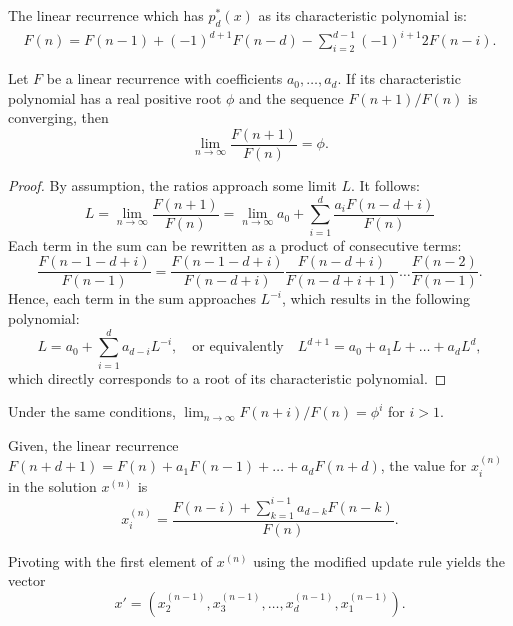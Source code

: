 \documentclass[english,version-2020-11]{uzl-thesis}
\begin{document}
\begin{example}
  The linear recurrence which has $p_d^*(x)$ as its characteristic polynomial is:
  \begin{align*}
    F(n) = F(n - 1) + (-1)^{d+1} F(n - d) - \sum_{i=2}^{d - 1} (-1)^{i+1} 2 F(n - i).
  \end{align*}
\end{example}

\begin{lemma}
  Let $F$ be a linear recurrence with coefficients $a_0, \dots, a_d$.
  If its characteristic polynomial has a real positive root $\phi$
  and the sequence $F(n+1)/F(n)$ is converging, then
  \[
    \lim_{n \to \infty} \frac{F(n + 1)}{F(n)} = \phi.
  \]
\end{lemma}

\begin{proof}
  By assumption, the ratios approach some limit $L$. It follows:
  \[
    L
    = \lim_{n \to \infty} \frac{F(n + 1)}{F(n)}
    = \lim_{n \to \infty} a_0 + \sum_{i = 1}^d \frac{a_i F(n - d + i)}{F(n)}
  \]
  Each term in the sum can be rewritten as a product of consecutive terms:
  \[
    \frac{F(n - 1 - d + i)}{F(n - 1)}
    = \frac{F(n - 1 - d + i)}{F(n - d + i)} \frac{F(n - d + i)}{F(n - d + i + 1)} \dots \frac{F(n - 2)}{F(n-1)}.
  \]
  Hence, each term in the sum approaches $L^{-i}$,
  which results in the following polynomial:
  \[
    L = a_0 + \sum_{i = 1}^d a_{d - i} L^{-i},
    \quad \text{or equivalently} \quad
    L^{d+1} = a_0 + a_1 L + \dots + a_d L^d,
  \]
  which directly corresponds to a root of its characteristic polynomial.
\end{proof}

\begin{corollary}
  Under the same conditions, $\lim_{n \to \infty} F(n + i) / F(n) = \phi^i$ for $i > 1$.
\end{corollary}

Given, the linear recurrence $F(n + d + 1) = F(n) + a_1 F(n - 1) + \dots + a_d F(n + d)$,
the value for $x_i^{(n)}$ in the solution $x^{(n)}$ is
\begin{equation}
  \label{eq:general-solution}
  x_i^{(n)} = \frac{F(n - i) + \sum_{k=1}^{i-1} a_{d-k} F(n - k)}{F(n)}.
\end{equation}

\begin{lemma}
  Pivoting with the first element of $x^{(n)}$ using the modified update rule yields the vector
  \[
    x' = (x^{(n-1)}_2, x^{(n-1)}_3, \dots, x^{(n-1)}_d, x^{(n-1)}_1).
  \]
\end{lemma}
\end{document}
